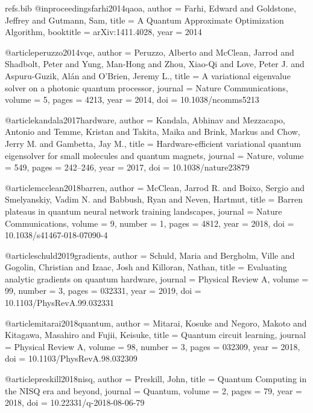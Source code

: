 \begin{filecontents*}{refs.bib}
@inproceedings{farhi2014qaoa,
  author    = {Farhi, Edward and Goldstone, Jeffrey and Gutmann, Sam},
  title     = {A Quantum Approximate Optimization Algorithm},
  booktitle = {arXiv:1411.4028},
  year      = {2014}
}

@article{peruzzo2014vqe,
  author  = {Peruzzo, Alberto and McClean, Jarrod and Shadbolt, Peter and Yung, Man-Hong and Zhou, Xiao-Qi and Love, Peter J. and Aspuru-Guzik, Al{\'a}n and O'Brien, Jeremy L.},
  title   = {A variational eigenvalue solver on a photonic quantum processor},
  journal = {Nature Communications},
  volume  = {5},
  pages   = {4213},
  year    = {2014},
  doi     = {10.1038/ncomms5213}
}

@article{kandala2017hardware,
  author  = {Kandala, Abhinav and Mezzacapo, Antonio and Temme, Kristan and Takita, Maika and Brink, Markus and Chow, Jerry M. and Gambetta, Jay M.},
  title   = {Hardware-efficient variational quantum eigensolver for small molecules and quantum magnets},
  journal = {Nature},
  volume  = {549},
  pages   = {242--246},
  year    = {2017},
  doi     = {10.1038/nature23879}
}

@article{mcclean2018barren,
  author  = {McClean, Jarrod R. and Boixo, Sergio and Smelyanskiy, Vadim N. and Babbush, Ryan and Neven, Hartmut},
  title   = {Barren plateaus in quantum neural network training landscapes},
  journal = {Nature Communications},
  volume  = {9},
  number  = {1},
  pages   = {4812},
  year    = {2018},
  doi     = {10.1038/s41467-018-07090-4}
}

@article{schuld2019gradients,
  author  = {Schuld, Maria and Bergholm, Ville and Gogolin, Christian and Izaac, Josh and Killoran, Nathan},
  title   = {Evaluating analytic gradients on quantum hardware},
  journal = {Physical Review A},
  volume  = {99},
  number  = {3},
  pages   = {032331},
  year    = {2019},
  doi     = {10.1103/PhysRevA.99.032331}
}

@article{mitarai2018quantum,
  author  = {Mitarai, Kosuke and Negoro, Makoto and Kitagawa, Masahiro and Fujii, Keisuke},
  title   = {Quantum circuit learning},
  journal = {Physical Review A},
  volume  = {98},
  number  = {3},
  pages   = {032309},
  year    = {2018},
  doi     = {10.1103/PhysRevA.98.032309}
}

@article{preskill2018nisq,
  author  = {Preskill, John},
  title   = {Quantum Computing in the NISQ era and beyond},
  journal = {Quantum},
  volume  = {2},
  pages   = {79},
  year    = {2018},
  doi     = {10.22331/q-2018-08-06-79}
}


\end{filecontents*}
